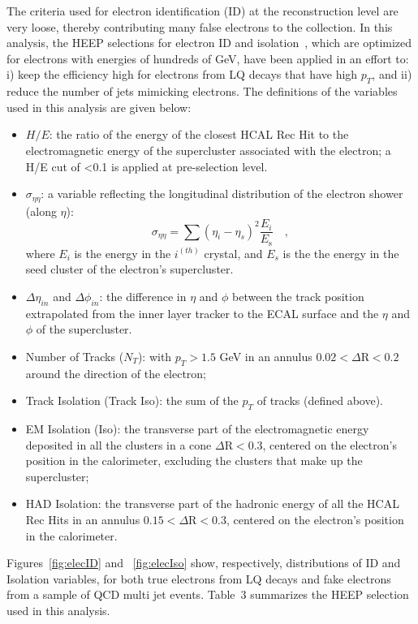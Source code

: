 The criteria used for electron identification (ID) at the reconstruction level are very loose, thereby contributing many false electrons 
to the collection. In this analysis, the HEEP selections for electron ID and isolation~\cite{EleID}, which are optimized for 
electrons with energies of hundreds of GeV, have been applied in an effort to: i) keep the efficiency high for electrons 
from LQ decays that have high $p_{T}$, and ii) reduce the number of jets mimicking electrons.
The definitions of the variables used in this analysis are given below:
%
\begin{itemize}
%
\item $H/E$: the ratio of the energy of the closest HCAL Rec Hit to the electromagnetic energy of 
the supercluster associated with the electron; a H/E cut of <0.1 is applied at pre-selection level.
%
\item $\sigma_{\eta\eta}$: a variable reflecting the longitudinal distribution of the electron shower (along $\eta$):
\begin{displaymath}
\sigma_{\eta\eta} = \sum( \eta_i - \eta_s )^2 \frac{E_i}{E_{\mbox{s}}} \quad ,
\end{displaymath}
where $E_i$ is the energy in the $i^(th)$ crystal, and $E_s$ is the the energy in the seed cluster of the electron's supercluster.
%
\item $\Delta\eta_{in}$ and $\Delta\phi_{in}$: the difference in $\eta$ and $\phi$ between the track position extrapolated from 
the inner layer tracker to the ECAL surface and the $\eta$ and $\phi$ of the supercluster.
%
\item Number of Tracks ($N_T$): with $p_{T}>1.5$ GeV in an annulus $0.02 < \Delta\mbox{R} < 0.2 $ around the direction of the electron;
%
\item Track Isolation (Track Iso): the sum of the $p_{T}$ of tracks (defined above).
%
%
\item EM Isolation (Iso): the transverse part of the electromagnetic energy deposited in all the clusters in a cone $\Delta\mbox{R} < 0.3$, 
centered on the electron's position in the calorimeter, excluding the clusters that make up the supercluster;
%
\item HAD Isolation: the transverse part of the hadronic energy of all the HCAL Rec Hits in an annulus
$0.15 < \Delta\mbox{R} < 0.3$, centered on the electron's position in the calorimeter. 
%
\end{itemize}

Figures~\ref{fig:elecID} and ~\ref{fig:elecIso} show, respectively, distributions of ID and Isolation variables, 
for both true electrons from LQ decays and fake electrons from a sample of QCD multi jet events. 
Table~3 
summarizes the HEEP selection used in this analysis. 

